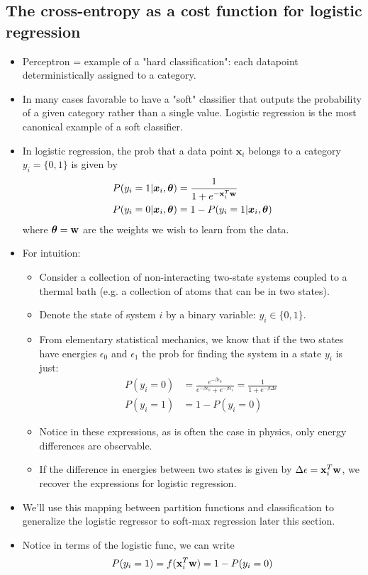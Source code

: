 \documentclass[norsk,a4paper,11pt]{article}
\begin{document}
\subsection{The cross-entropy as a cost function for logistic regression}
\begin{itemize}
	\item Perceptron = example of a "hard classification": each datapoint deterministically assigned to a category.
	\item In many cases favorable to have a "soft" classifier that outputs the probability of a given category rather than a single value. Logistic regression is the most canonical example of a soft classifier. 
	\item In logistic regression, the prob that a data point $\bm{x}_i$ belongs to a category $y_i = \{ 0, 1\}$ is given by
	\begin{align}
		P(y_i = 1|\bm{x}_i, \bm{\theta}) &= \frac{1}{1 + e^{-\text{\textbf{x}}_i^T \text{\textbf{w}}}} \\
		P(y_i = 0|\bm{x}_i, \bm{\theta}) &= 1 - P(y_i = 1|\bm{x}_i, \bm{\theta})
	\end{align}
	where $\bm{\theta} = \text{\textbf{w}}$ are the weights we wish to learn from the data. 
	\item For intuition: 
	\begin{itemize}
		\item Consider a collection of non-interacting two-state systems coupled to a thermal bath (e.g. a collection of atoms that can be in two states).
		\item Denote the state of system $i$ by a binary variable: $y_i \in \{ 0, 1\}$. 
		\item From elementary statistical mechanics, we know that if the two states have energies $\epsilon_0$ and $\epsilon_1$ the prob for finding the system in a state $y_i$ is just:
		\begin{align}
			P(y_i = 0) &= \frac{e^{-\beta \epsilon_0}}{e^{-\beta \epsilon_0} + e^{-\beta \epsilon_1}} = \frac{1}{1 + e^{-\beta \Delta \epsilon}} \\
			P(y_i = 1) &= 1 - P(y_i = 0)
		\end{align}
		\item Notice in these expressions, as is often the case in physics, only energy differences are observable. 
		\item If the difference in energies between two states is given by $\Delta \epsilon = \text{\textbf{x}}_i^T \text{\textbf{w}}$, we recover the expressions for logistic regression.
	\end{itemize}
	\item We'll use this mapping between partition functions and classification to generalize the logistic regressor to soft-max regression later this section.
	\item Notice in terms of the logistic func, we can write
	\begin{align}
		P(y_i = 1) = f(\text{\textbf{x}}_i^T \text{\textbf{w}}) = 1-P(y_i = 0)
	\end{align}


\end{itemize}
\end{document}
